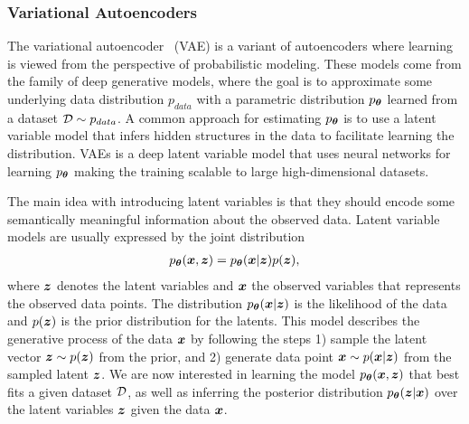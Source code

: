 \subsubsection{Variational Autoencoders}\label{sec:variational_autoencoders}

The variational autoencoder~\cite{kingma2013auto} (VAE) is a variant of autoencoders where learning is viewed from the perspective of probabilistic modeling. These models come from the family of deep generative models, where the goal is to approximate some underlying data distribution $p_{data}$ with a parametric distribution $p_{{\bm{\theta}}}$ learned from a dataset ${\mathcal{D}} \sim p_{data}$. A common approach for estimating $p_{{\bm{\theta}}}$ is to use a latent variable model that infers hidden structures in the data to facilitate learning the distribution. VAEs is a deep latent variable model that uses neural networks for learning $p_{{\bm{\theta}}}$ making the training scalable to large high-dimensional datasets. 

The main idea with introducing latent variables is that they should encode some semantically meaningful information about the observed data. Latent variable models are usually expressed by the joint distribution 
\begin{align}
	p_{{\bm{\theta}}}({\bm{x}}, {\bm{z}}) = p_{{\bm{\theta}}}({\bm{x}} | {\bm{z}}) p({\bm{z}}),
\end{align}
where ${\bm{z}}$ denotes the latent variables and ${\bm{x}}$ the observed variables that represents the observed data points. The distribution $p_{{\bm{\theta}}}({\bm{x}} | {\bm{z}})$ is the likelihood of the data and $p({\bm{z}})$ is the prior distribution for the latents. This model describes the generative process of the data ${\bm{x}}$ by following the steps 1) sample the latent vector ${\bm{z}} \sim p({\bm{z}})$ from the prior, and 2) generate data point ${\bm{x}} \sim p({\bm{x}} | {\bm{z}})$ from the sampled latent ${\bm{z}}$. We are now interested in learning the model $p_{{\bm{\theta}}}({\bm{x}}, {\bm{z}})$ that best fits a given dataset ${\mathcal{D}}$, as well as inferring the posterior distribution $p_{{\bm{\theta}}}({\bm{z}} | {\bm{x}})$ over the latent variables ${\bm{z}}$ given the data ${\bm{x}}$.

